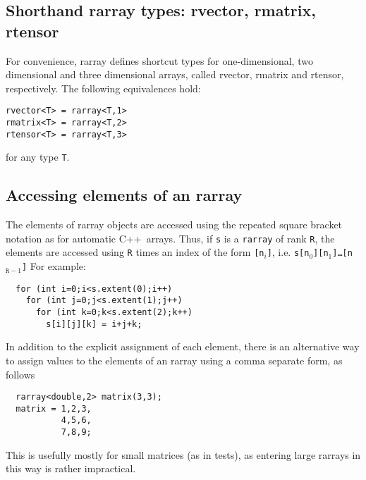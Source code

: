 \documentclass[11pt,twoside]{article}
\newcommand{\cxx}{C{++}}
\begin{document}
\subsection{Shorthand rarray types: rvector, rmatrix, rtensor}

For convenience, rarray defines shortcut types for
one-dimensional, two dimensional and three dimensional arrays, called
rvector, rmatrix and rtensor, respectively. The following equivalences hold:

\begin{framed}\vspace{-18pt}%
\begin{verbatim}
rvector<T> = rarray<T,1>
rmatrix<T> = rarray<T,2>
rtensor<T> = rarray<T,3>
\end{verbatim}
\vspace{-18pt}\end{framed}\noindent
for any type \texttt{T}.

\subsection{Accessing elements of an rarray}

The elements of rarray objects are accessed using the repeated square
bracket notation as for automatic \cxx\ arrays. Thus, if \texttt{s} is a \texttt{rarray} of rank \texttt R, the elements are accessed using \texttt{R} times an index of the form \texttt{[n$_i$]}, i.e. \texttt{s[n$_0$][n$_1$]\dots[n$_{\texttt{R}-1}$]}
For example:\vspace{-9pt}
\begin{framed}\vspace{-18pt}%
\begin{verbatim}
  for (int i=0;i<s.extent(0);i++)
    for (int j=0;j<s.extent(1);j++)
      for (int k=0;k<s.extent(2);k++)
        s[i][j][k] = i+j+k;
\end{verbatim}%
\vspace{-12pt}
\end{framed}%

In addition to the explicit assignment of each element, there is an
alternative way to assign values to the elements of an rarray using a
comma separate form, as follows
\vspace{-9pt}
\begin{framed}\vspace{-18pt}%
\begin{verbatim}
  rarray<double,2> matrix(3,3);
  matrix = 1,2,3,
           4,5,6,
           7,8,9;
\end{verbatim}%
\vspace{-12pt}
\end{framed}\vspace{-8pt}\noindent
This is usefully mostly for small matrices (as in tests), as entering
large rarrays in this way is rather impractical.
\end{document}
